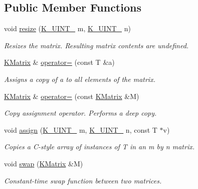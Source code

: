\subsection*{Public Member Functions}
\begin{DoxyCompactItemize}
\item 
void \mbox{\hyperlink{classKalman_1_1KMatrix_a7e78b888fa945c1e5c8cd0513a7f9692}{resize}} (\mbox{\hyperlink{namespaceKalman_a628a50cae10f6e2035393d4f96c698bd}{K\+\_\+\+U\+I\+N\+T\+\_}} m, \mbox{\hyperlink{namespaceKalman_a628a50cae10f6e2035393d4f96c698bd}{K\+\_\+\+U\+I\+N\+T\+\_}} n)
\begin{DoxyCompactList}\small\item\em Resizes the matrix. Resulting matrix contents are undefined. \end{DoxyCompactList}\item 
\mbox{\hyperlink{classKalman_1_1KMatrix}{K\+Matrix}} \& \mbox{\hyperlink{classKalman_1_1KMatrix_ae8c66e919d8da3b058faaeece6ba7817}{operator=}} (const T \&a)
\begin{DoxyCompactList}\small\item\em Assigns a copy of {\ttfamily a} to all elements of the matrix. \end{DoxyCompactList}\item 
\mbox{\hyperlink{classKalman_1_1KMatrix}{K\+Matrix}} \& \mbox{\hyperlink{classKalman_1_1KMatrix_a1601c9d04ef2d7831254520c1376de45}{operator=}} (const \mbox{\hyperlink{classKalman_1_1KMatrix}{K\+Matrix}} \&M)
\begin{DoxyCompactList}\small\item\em Copy assignment operator. Performs a deep copy. \end{DoxyCompactList}\item 
void \mbox{\hyperlink{classKalman_1_1KMatrix_ac79d2839749be2b5b1ac268a151d59ef}{assign}} (\mbox{\hyperlink{namespaceKalman_a628a50cae10f6e2035393d4f96c698bd}{K\+\_\+\+U\+I\+N\+T\+\_}} m, \mbox{\hyperlink{namespaceKalman_a628a50cae10f6e2035393d4f96c698bd}{K\+\_\+\+U\+I\+N\+T\+\_}} n, const T $\ast$v)
\begin{DoxyCompactList}\small\item\em Copies a C-\/style array of instances of {\ttfamily T} in an {\ttfamily m} by {\ttfamily n} matrix. \end{DoxyCompactList}\item 
void \mbox{\hyperlink{classKalman_1_1KMatrix_a35c6ad576733f17d0de89d2bbfdbfbd2}{swap}} (\mbox{\hyperlink{classKalman_1_1KMatrix}{K\+Matrix}} \&M)
\begin{DoxyCompactList}\small\item\em Constant-\/time swap function between two matrices. \end{DoxyCompactList}\end{DoxyCompactItemize}
